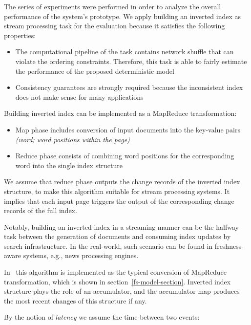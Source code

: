 
\label {fs-experiments-seciton}
The series of experiments were performed in order to analyze the overall performance of the system's prototype. We apply building an inverted index as stream processing task for the evaluation because it satisfies the following properties:

\begin{itemize}
    \item The computational pipeline of the task contains network shuffle that can violate the ordering constraints. Therefore, this task is able to fairly estimate the performance of the proposed deterministic model
    \item Consistency guarantees are strongly required because the inconsistent index does not make sense for many applications
\end{itemize}

Building inverted index can be implemented as a MapReduce transformation: 

\begin{itemize}
    \item Map phase includes conversion of input documents into the key-value pairs {\it (word; word positions within the page)}
    \item Reduce phase consists of combining word positions for the corresponding word into the single index structure 
\end{itemize}

We assume that reduce phase outputs the change records of the inverted index structure, to make this algorithm suitable for stream processing systems. It implies that each input page triggers the output of the corresponding change records of the full index. 

Notably, building an inverted index in a streaming manner can be the halfway task between the generation of documents and consuming index updates by search infrastructure. In the real-world, such scenario can be found in freshness-aware systems, e.g., news processing engines.
 
In \FlameStream\ this algorithm is implemented as the typical conversion of MapReduce transformation, which is shown in section~\ref{fs-model-section}. Inverted index structure plays the role of an accumulator, and the accumulator map produces the most recent changes of this structure if any.

By the notion of {\it latency} we assume the time between two events: 


